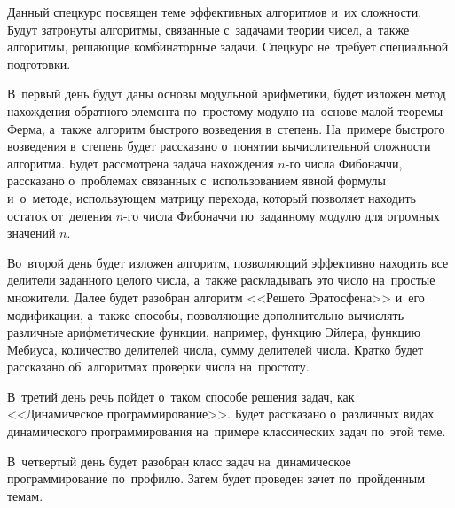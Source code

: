 




Данный спецкурс посвящен теме эффективных алгоритмов и~их сложности.
Будут затронуты алгоритмы, связанные с~задачами теории чисел, а~также
алгоритмы, решающие комбинаторные задачи.
Спецкурс не~требует специальной подготовки.

В~первый день будут даны основы модульной арифметики, будет изложен метод
нахождения обратного элемента по~простому модулю на~основе малой теоремы Ферма,
а~также алгоритм быстрого возведения в~степень.
На~примере быстрого возведения в~степень будет рассказано о~понятии
вычислительной сложности алгоритма.
Будет рассмотрена задача нахождения $n$-го числа Фибоначчи, рассказано
о~проблемах связанных с~использованием явной формулы и~о~методе, использующем
матрицу перехода, который позволяет находить остаток от~деления $n$-го числа
Фибоначчи по~заданному модулю для огромных значений $n$.

Во~второй день будет изложен алгоритм, позволяющий эффективно находить все
делители заданного целого числа, а~также раскладывать это число на~простые
множители.
Далее будет разобран алгоритм <<Решето Эратосфена>> и~его модификации, а~также
способы, позволяющие дополнительно вычислять различные арифметические функции,
например, функцию Эйлера, функцию Мебиуса, количество делителей числа, сумму
делителей числа.
Кратко будет рассказано об~алгоритмах проверки числа на~простоту.

В~третий день речь пойдет о~таком способе решения задач, как
<<Динамическое программирование>>.
Будет рассказано о~различных видах динамического программирования на~примере
классических задач по~этой теме.

В~четвертый день будет разобран класс задач на~динамическое программирование
по~профилю.
Затем будет проведен зачет по~пройденным темам.

